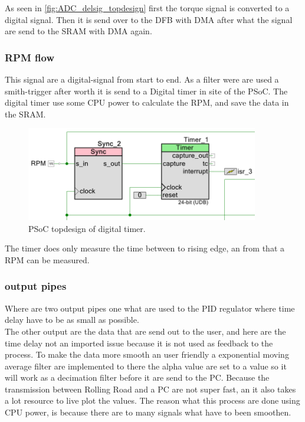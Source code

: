 As seen in \ref{fig:ADC_delsig_topdesign} first the torque signal is converted to a digital signal. Then it is send over to the DFB with DMA after what the signal are send to the SRAM with DMA again. 

\subsubsection{RPM flow}

This signal are a digital-signal from start to end. As a filter were are used a smith-trigger after worth it is send to a Digital timer in site of the PSoC. The digital timer use some CPU power to calculate the RPM, and save the data in the SRAM.

\begin{figure}[H]
	\centering
	\includegraphics [width=4in]{Software/Pictures/RPM_sensor_topdesign.PNG}
	\caption{PSoC topdesign of digital timer.}
	\label{fig:digital_timer_topdesign}
\end{figure}

The timer does only measure the time between to rising edge, an from that a RPM can be measured. 

\subsubsection{output pipes}

Where are two output pipes one what are used to the PID regulator where time delay have to be as small as possible.\\
The other output are the data that are send out to the user, and here are the time delay not an imported issue because it is not used as feedback to the process. To make the data more smooth an user friendly a exponential moving average filter are implemented to there the alpha value are set to a value so it will work as a decimation filter before it are send to the PC. Because the transmission between Rolling Road and a PC are not super fast, an it also takes a lot resource to live plot the values. The reason what this process are done using CPU power, is because there are to many signals what have to been smoothen.


